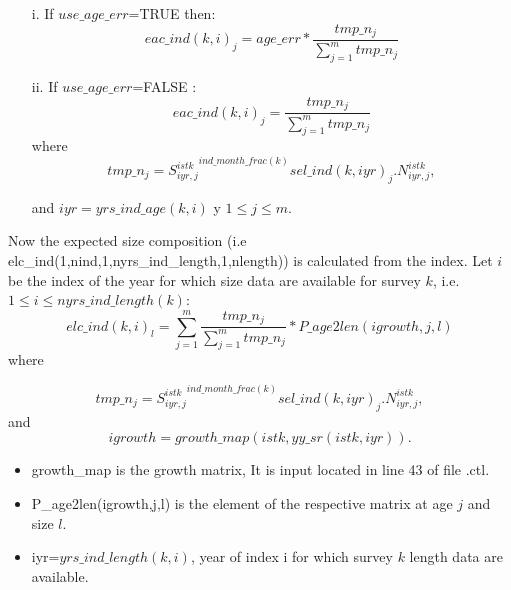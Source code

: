 \documentclass{article}
\begin{document}
\begin{itemize}
        \item [i.] If $use\_age\_err$=TRUE then: 
    \begin{equation}
        eac\_ind(k,i)_j=age\_err*\dfrac{tmp\_n_j}{\sum_{j=1}^mtmp\_n_j}
    \end{equation}
        \item [ii.] If $use\_age\_err$=FALSE :
        \begin{equation}eac\_ind(k,i)_j=\dfrac{tmp\_n_j}{\sum_{j=1}^mtmp\_n_j}
    \end{equation}
where \begin{equation}
    tmp\_n_j= {S^{istk}_{iyr,j}}^{ind\_month\_frac(k)}sel\_ind(k,iyr)_j.N^{istk}_{iyr,j},
\end{equation}

and  $iyr=yrs\_ind\_age(k,i)$ y $1\leq j\leq m$.
    \end{itemize}

Now the expected size composition (i.e elc\_ind(1,nind,1,nyrs\_ind\_length,1,nlength)) is calculated from the index. Let $i$ be the index of the year for which size data are available for survey $k$, i.e.   $1\leq i \leq nyrs\_ind\_length(k)$:
\begin{equation}
    elc\_ind(k,i)_l=\sum_{j=1}^m\dfrac{tmp\_n_j}{\sum_{j=1}^mtmp\_n_j}*P\_age2len(igrowth,j,l)
\end{equation}
where

\begin{equation}
    tmp\_n_j= {S^{istk}_{iyr,j}}^{ind\_month\_frac(k)}sel\_ind(k,iyr)_j.N^{istk}_{iyr,j},
\end{equation}
and
\begin{equation}
    igrowth=growth\_map(istk,yy\_sr(istk,iyr)).    
\end{equation}

\begin{itemize}
    \item growth\_map is the growth matrix, It is input located in line 43 of file .ctl.
    \item P\_age2len(igrowth,j,l) is the element of the respective matrix at age $j$ and size $l$.
    \item iyr=$yrs\_ind\_length(k,i)$, year of index i for which survey $k$ length data are available.
    
    \end{itemize}
    
\end{document}
